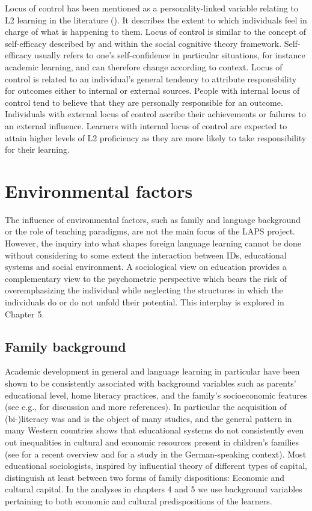 \documentclass[output=paper]{langscibook}
\begin{document}
Locus of control has been mentioned as a personality-linked variable relating to L2 learning in the literature (\citealt{Biedron2010,Peek2016}). It describes the extent to which individuals feel in charge of what is happening to them. Locus of control is similar to the concept of self-efficacy described by \citet{Bandura1986} and \citet{Rotter1990} within the social cognitive theory framework. Self-efficacy usually refers to one’s self-confidence in particular situations, for instance academic learning, and can therefore change according to context. Locus of control is related to an individual’s general tendency to attribute responsibility for outcomes either to internal or external sources. People with internal locus of control tend to believe that they are personally responsible for an outcome. Individuals with external locus of control ascribe their achievements or failures to an external influence. Learners with internal locus of control are expected to attain higher levels of L2 proficiency as they are more likely to take responsibility for their learning. 

\section{Environmental factors}

The influence of environmental factors, such as family and language background or the role of teaching paradigms, are not the main focus of the LAPS project. However, the inquiry into what shapes foreign language learning cannot be done without considering to some extent the interaction between IDs, educational systems and social environment. A sociological view on education provides a complementary view to the psychometric perspective which bears the risk of overemphasizing the individual while neglecting the structures in which the individuals do or do not unfold their potential. This interplay is explored in Chapter 5. 

\subsection{Family background} %

Academic development in general and language learning in particular have been shown to be consistently associated with background variables such as parents’ educational level, home literacy practices, and the family’s socioeconomic features (see e.g., \citealt{AvineriEtAl2015} for discussion and more references). In particular the acquisition of (bi-)literacy was and is the object of many studies, and the general pattern in many Western countries shows that educational systems do not consistently even out inequalities in cultural and economic resources present in children’s families (see \citealt{Farkas2018} for a recent overview and \citealt{KigelEtAl2015} for a study in the German-speaking context). Most educational sociologists, inspired by  influential theory of different types of capital, distinguish at least between two forms of family dispositions: Economic and cultural capital. In the analyses in chapters 4 and 5 we use background variables pertaining to both economic and cultural predispositions of the learners.
\end{document}
